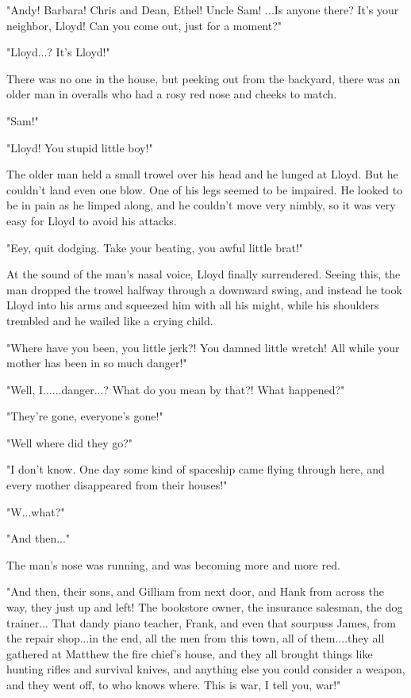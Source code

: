 \documentclass[
]{article}
\begin{document}
"Andy! Barbara! Chris and Dean, Ethel! Uncle Sam! ...Is anyone there?
It's your neighbor, Lloyd! Can you come out, just for a moment?"

"Lloyd...? It's Lloyd!"

There was no one in the house, but peeking out from the backyard, there
was an older man in overalls who had a rosy red nose and cheeks to
match.

"Sam!"

"Lloyd! You stupid little boy!"

The older man held a small trowel over his head and he lunged at Lloyd.
But he couldn't land even one blow. One of his legs seemed to be
impaired. He looked to be in pain as he limped along, and he couldn't
move very nimbly, so it was very easy for Lloyd to avoid his attacks.

"Eey, quit dodging. Take your beating, you awful little brat!"

At the sound of the man's nasal voice, Lloyd finally surrendered. Seeing
this, the man dropped the trowel halfway through a downward swing, and
instead he took Lloyd into his arms and squeezed him with all his might,
while his shoulders trembled and he wailed like a crying child.

"Where have you been, you little jerk?! You damned little wretch! All
while your mother has been in so much danger!"

"Well, I......danger...? What do you mean by that?! What happened?"

"They're gone, everyone's gone!"

"Well where did they go?"

"I don't know. One day some kind of spaceship came flying through here,
and every mother disappeared from their houses!"

"W...what?"

"And then..."

The man's nose was running, and was becoming more and more red.

"And then, their sons, and Gilliam from next door, and Hank from across
the way, they just up and left! The bookstore owner, the insurance
salesman, the dog trainer... That dandy piano teacher, Frank, and even
that sourpuss James, from the repair shop...in the end, all the men from
this town, all of them....they all gathered at Matthew the fire chief's
house, and they all brought things like hunting rifles and survival
knives, and anything else you could consider a weapon, and they went
off, to who knows where. This is war, I tell you, war!"
\end{document}
